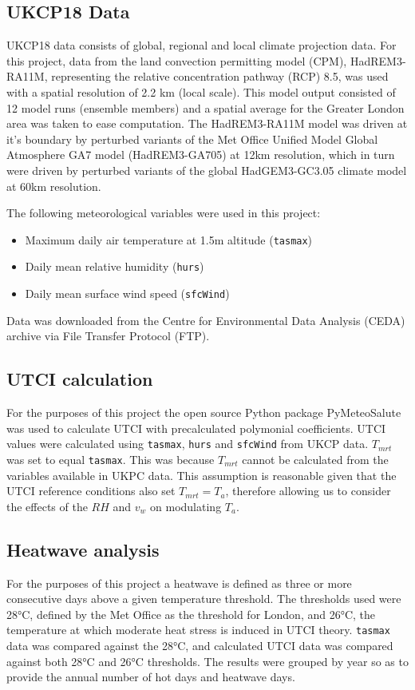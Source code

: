 \documentclass[10pt,letterpaper]{article}
\begin{document}
\subsection*{UKCP18 Data}
UKCP18 data consists of global, regional and local climate projection data. 
For this project, data from the land convection permitting model (CPM), HadREM3-RA11M, representing the relative concentration pathway (RCP) 8.5, was used with a spatial resolution of 2.2 km (local scale).
This model output consisted of 12 model runs (ensemble members) and a spatial average for the Greater London area was taken to ease computation.
The HadREM3-RA11M model was driven at it's boundary by perturbed variants of the Met Office Unified Model Global Atmosphere GA7 model (HadREM3-GA705) at 12km resolution, which in turn were driven by perturbed variants of the global HadGEM3-GC3.05 climate model at 60km resolution.\cite{UKCP18}

\noindent
The following meteorological variables were used in this project:
\begin{itemize}
    \item Maximum daily air temperature at 1.5m altitude (\texttt{tasmax})
    \item Daily mean relative humidity (\texttt{hurs})
    \item Daily mean surface wind speed (\texttt{sfcWind})
\end{itemize}
Data was downloaded from the Centre for Environmental Data Analysis (CEDA) archive via File Transfer Protocol (FTP).\cite{UKCP18data}

\subsection*{UTCI calculation}
For the purposes of this project the open source Python package PyMeteoSalute was used to calculate UTCI with precalculated polymonial coefficients.\cite{pymeteosalute}
UTCI values were calculated using \texttt{tasmax}, \texttt{hurs} and \texttt{sfcWind} from UKCP data.
$T_{mrt}$ was set to equal \texttt{tasmax}.
This was because $T_{mrt}$ cannot be calculated from the variables available in UKPC data.
This assumption is reasonable given that the UTCI reference conditions also set $T_{mrt}=T_a$, therefore allowing us to consider the effects of the $RH$ and $v_w$ on modulating $T_a$.


\subsection*{Heatwave analysis}
For the purposes of this project a heatwave is defined as three or more consecutive days above a given temperature threshold.
The thresholds used were 28°C, defined by the Met Office as the threshold for London\cite{McCarthy2019}, and 26°C, the temperature at which moderate heat stress is induced in UTCI theory.\cite{Blazejczyk2013}
\texttt{tasmax} data was compared against the 28°C, and calculated UTCI data was compared against both 28°C and 26°C thresholds.
The results were grouped by year so as to provide the annual number of hot days and heatwave days.
\end{document}
